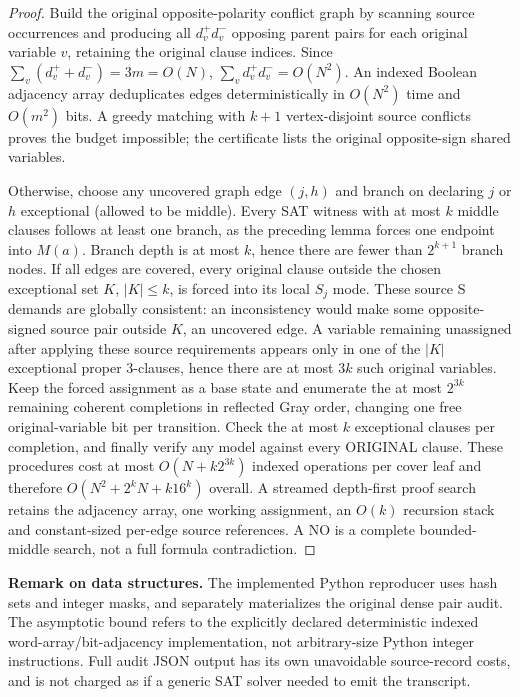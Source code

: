 \documentclass[10pt]{article}
\begin{document}
\begin{proof}
Build the original opposite-polarity conflict graph by scanning source occurrences and producing all $d_v^+d_v^-$ opposing parent pairs for each original variable $v$, retaining the original clause indices. Since $\sum_v(d_v^++d_v^-)=3m=O(N)$, $\sum_vd_v^+d_v^-=O(N^2)$. An indexed Boolean adjacency array deduplicates edges deterministically in $O(N^2)$ time and $O(m^2)$ bits. A greedy matching with $k+1$ vertex-disjoint source conflicts proves the budget impossible; the certificate lists the original opposite-sign shared variables.

Otherwise, choose any uncovered graph edge $(j,h)$ and branch on declaring $j$ or $h$ exceptional (allowed to be middle). Every SAT witness with at most $k$ middle clauses follows at least one branch, as the preceding lemma forces one endpoint into $M(a)$. Branch depth is at most $k$, hence there are fewer than $2^{k+1}$ branch nodes. If all edges are covered, every original clause outside the chosen exceptional set $K$, $|K|\le k$, is forced into its local $S_j$ mode. These source S demands are globally consistent: an inconsistency would make some opposite-signed source pair outside $K$, an uncovered edge. A variable remaining unassigned after applying these source requirements appears only in one of the $|K|$ exceptional proper 3-clauses, hence there are at most $3k$ such original variables. Keep the forced assignment as a base state and enumerate the at most $2^{3k}$ remaining coherent completions in reflected Gray order, changing one free original-variable bit per transition. Check the at most $k$ exceptional clauses per completion, and finally verify any model against every ORIGINAL clause. These procedures cost at most $O(N+ k2^{3k})$ indexed operations per cover leaf and therefore $O(N^2+2^kN+k16^k)$ overall. A streamed depth-first proof search retains the adjacency array, one working assignment, an $O(k)$ recursion stack and constant-sized per-edge source references. A NO is a complete bounded-middle search, not a full formula contradiction.
\end{proof}
\noindent\textbf{Remark on data structures.} The implemented Python reproducer uses hash sets and integer masks, and separately materializes the original dense pair audit. The asymptotic bound refers to the explicitly declared deterministic indexed word-array/bit-adjacency implementation, not arbitrary-size Python integer instructions. Full audit JSON output has its own unavoidable source-record costs, and is not charged as if a generic SAT solver needed to emit the transcript.
\end{document}
